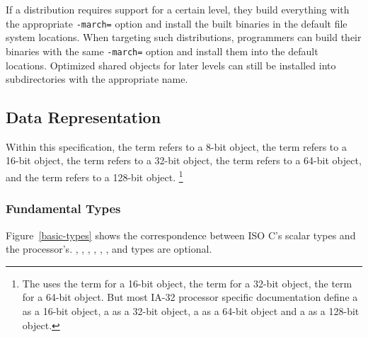If a distribution requires support for a certain level, they build
everything with the appropriate \texttt{-march=} option and install
the built binaries in the default file system locations.  When
targeting such distributions, programmers can build their binaries
with the same \texttt{-march=} option and install them into the
default locations.  Optimized shared objects for later levels can
still be installed into subdirectories with the appropriate name.


\subsection{Data Representation}

Within this specification, the term \emph{\textindex{\byte{}}} refers to
a 8-bit object, the term \emph{\textindex{\twobyte{}}} refers to a 16-bit
object, the term \emph{\textindex{\fourbyte{}}} refers to a 32-bit
object, the term \emph{\textindex{\eightbyte{}}} refers to a 64-bit
object, and the term \emph{\textindex{\sixteenbyte{}}} refers to a
128-bit object.%
\footnote{The \intelabi uses the term \emph{} for
  a 16-bit object, the term \emph{} for a 32-bit
  object, the term \emph{} for a 64-bit object.  But
  most IA-32 processor specific documentation define a
  \emph{} as a 16-bit object, a
  \emph{} as a 32-bit object, a
  \emph{} as a 64-bit object and a
  \emph{} as a 128-bit object.}

\subsubsection{Fundamental Types}

Figure~\ref{basic-types} shows the correspondence between ISO C's
scalar types and the processor's.  , ,
,
, , ,  and
 types are optional.

